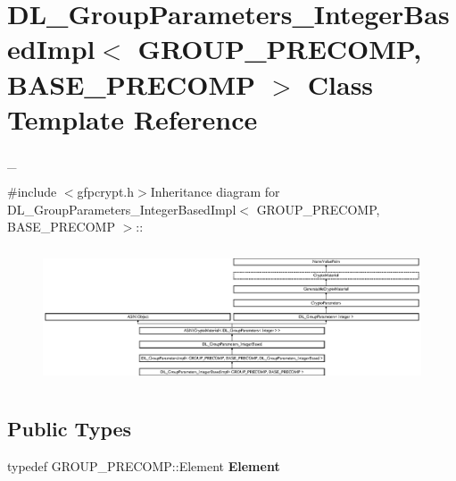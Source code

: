 \hypertarget{class_d_l___group_parameters___integer_based_impl}{
\section{DL\_\-GroupParameters\_\-IntegerBasedImpl$<$ GROUP\_\-PRECOMP, BASE\_\-PRECOMP $>$ Class Template Reference}
\label{class_d_l___group_parameters___integer_based_impl}
}


\_\-  


{\ttfamily \#include $<$gfpcrypt.h$>$}Inheritance diagram for DL\_\-GroupParameters\_\-IntegerBasedImpl$<$ GROUP\_\-PRECOMP, BASE\_\-PRECOMP $>$::\begin{figure}[H]
\begin{center}
\leavevmode
\includegraphics[height=4.04494cm]{class_d_l___group_parameters___integer_based_impl}
\end{center}
\end{figure}
\subsection*{Public Types}
\begin{DoxyCompactItemize}
\item 
\hypertarget{class_d_l___group_parameters___integer_based_impl_a0d2ec78e9a74ec651474b995e931aa74}{
typedef GROUP\_\-PRECOMP::Element {\bfseries Element}}
\label{class_d_l___group_parameters___integer_based_impl_a0d2ec78e9a74ec651474b995e931aa74}

\end{DoxyCompactItemize}
